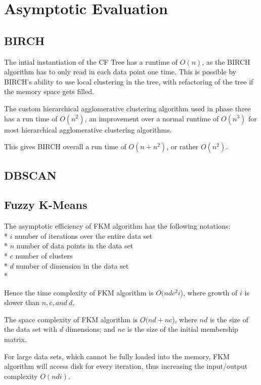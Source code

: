 \documentclass[conference, 10pt]{IEEEtran}
\begin{document}

  \section{Asymptotic Evaluation}

  \subsection{BIRCH}
  The intial instantiation of the CF Tree has a runtime of $O(n)$, as the BIRCH algorithm has to only read in each data point one time. This is possible by BIRCH's ability to use local clustering in the tree, with refactoring of the tree if the memory space gets filled.

  The custom hierarchical agglomerative clustering algorithm used in phase three has a run time of $O(n^2)$, an improvement over a normal runtime of $O(n^3)$ for most hierarchical agglomerative clustering algorithms.

  This gives BIRCH overall a run time of $O(n+n^2)$, or rather $O(n^2)$.
  \subsection{DBSCAN}


  \subsection{Fuzzy K-Means}
  The asymptotic efficiency of FKM algorithm has the following notations:\\*
  $i$ number of iterations over the entire data set\\*
  $n$ number of data points in the data set\\*
  $c$ number of clusters\\*
  $d$ number of dimension in the data set\\*

  Hence the time complexity of FKM algorithm is $O(ndc^2i$), where growth of $i$ is slower than $n, c, and\:d$.

  The space complexity of FKM algorithm is $O(nd+nc$), where $nd$ is the size of the data set with $d$ dimensions; and $nc$ is the size of the initial membership matrix.

  For large data sets, which cannot be fully loaded into the memory, FKM algorithm will access
  disk for every iteration, thus increasing the input/output complexity $O(ndi)$.
\end{document}
